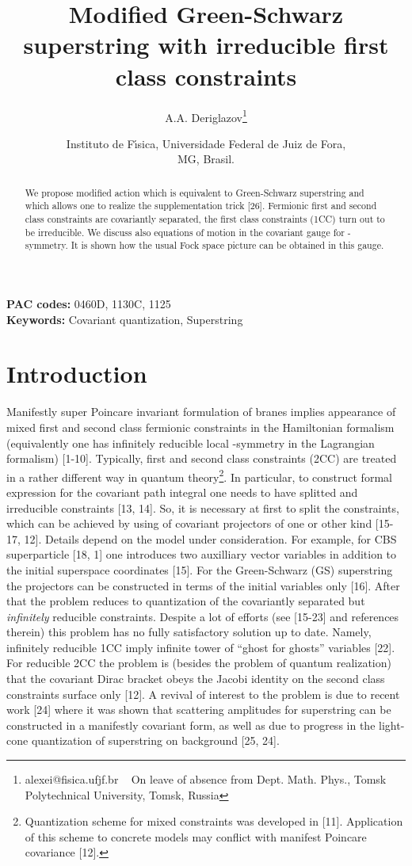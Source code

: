 \documentclass[a4paper]{article}
\title{Modified \myHighlight{$N=1$}\coordHE{} Green-Schwarz superstring with irreducible 
first class constraints}
\author{A.A. Deriglazov\thanks{alexei@fisica.ufjf.br ~ On leave of
absence from Dept. Math. Phys., Tomsk Polytechnical University,
Tomsk, Russia}}
\date{Instituto de F\'\i sica, Universidade Federal de Juiz de Fora,\\
MG, Brasil.}
\begin{document}
\maketitle
\large
\begin{abstract}
We propose modified action which is equivalent to \coordHE{} Green-Schwarz 
superstring and which allows one to realize the supplementation trick 
[26]. Fermionic first and second class constraints are covariantly 
separated, the first class constraints (1CC) turn out to be irreducible. 
We discuss also equations of motion in the covariant gauge for 
\myHighlight{$\kappa$}\coordHE{}-symmetry. It is shown how the usual Fock space picture can be 
obtained in this gauge.
\end{abstract}

{\bf PAC codes:} 0460D, 1130C, 1125 \\
{\bf Keywords:} Covariant quantization, Superstring \\

\noindent
\section{Introduction}
Manifestly super Poincare invariant formulation of branes implies 
appearance of mixed first and second class fermionic constraints 
in the Hamiltonian formalism (equivalently one has infinitely reducible 
local \myHighlight{$\kappa$}\coordHE{}-symmetry in the Lagrangian formalism) [1-10]. Typically, 
first and second class constraints (2CC) are treated in a rather 
different way in quantum theory\footnote{Quantization scheme for mixed 
constraints was developed in [11]. Application of this scheme to concrete 
models may conflict with manifest Poincare covariance [12].}. In 
particular, to construct formal expression for the covariant path 
integral one needs to have splitted and irreducible constraints [13, 14]. 
So, it is necessary at first to split the constraints, 
which can be achieved 
by using of covariant projectors of one or other kind [15-17, 12]. 
Details depend on the model under consideration. For example, for 
CBS superparticle [18, 1] one introduces two auxilliary vector 
variables in addition to the initial superspace coordinates [15]. 
For the Green-Schwarz (GS) superstring the projectors can be constructed 
in terms of the initial variables only [16]. After that the problem 
reduces to quantization of the covariantly separated but 
{\em infinitely} reducible constraints. Despite a lot of efforts 
(see [15-23] and references therein) this problem has no fully 
satisfactory solution up to date. Namely, infinitely reducible 1CC 
imply infinite tower of ``ghost for ghosts'' variables [22]. For 
reducible 2CC the problem is (besides the problem of quantum 
realization) that the covariant Dirac bracket obeys the Jacobi identity 
on the second class constraints surface only [12]. A revival of interest 
to the problem is due to recent work [24] where it was shown that 
scattering amplitudes for superstring can be constructed in a manifestly 
covariant form, as well as due to progress in the light-cone 
quantization of superstring on \coordHE{} background [25, 24].
\end{document}
